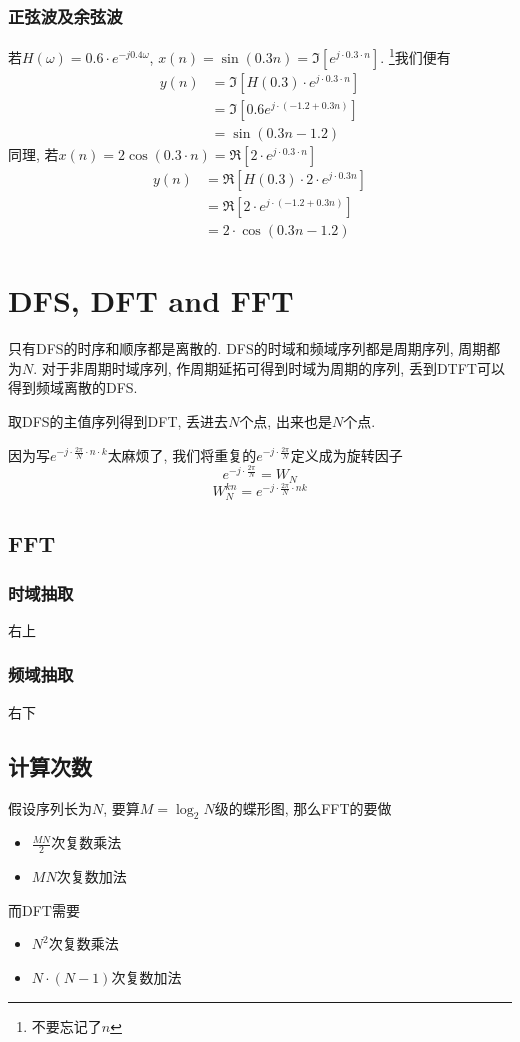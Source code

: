 \documentclass[a4paper]{report}
\begin{document}
\subsection{正弦波及余弦波}
若$H(\omega)=0.6\cdot e^{-j0.4\omega}$, $x(n)=\sin(0.3n)=\Im[e^{j\cdot 0.3\cdot n}]$. \footnote{不要忘记了$n$}我们便有
\begin{align*}
  y(n)&=\Im[H(0.3)\cdot e^{j\cdot 0.3\cdot n}]
  \\ &=\Im[0.6e^{j\cdot (-1.2+0.3n)}]
  \\ &=\sin (0.3n-1.2)
\end{align*}
同理, 若$x(n)=2 \cos(0.3\cdot n)=\Re[2\cdot e^{j\cdot 0.3\cdot n}]$
\begin{align*}
  y(n)&=\Re[H(0.3)\cdot 2\cdot e^{j\cdot 0.3n}]
  \\ &=\Re[2\cdot e^{j\cdot (-1.2+0.3n)}]
  \\ &= 2\cdot \cos (0.3n-1.2)
\end{align*}

\chapter{DFS, DFT and FFT}
只有DFS的时序和顺序都是离散的. DFS的时域和频域序列都是周期序列, 周期都为$N$. 对于非周期时域序列, 作周期延拓可得到时域为周期的序列, 丢到DTFT可以得到频域离散的DFS. 


取DFS的主值序列得到DFT, 丢进去$N$个点, 出来也是$N$个点. 

因为写$e^{-j\cdot \frac{2\pi}{N}\cdot n\cdot k}$太麻烦了, 我们将重复的$e^{-j\cdot\frac{2\pi}{N}}$定义成为旋转因子
\begin{equation}
  e^{-j\cdot\frac{2\pi}{N}}=W_N
\end{equation}
\begin{equation}
  W_N^{kn}=e^{-j\cdot \frac{2\pi}{N}\cdot n k}
\end{equation}
\section{FFT}
\subsection{时域抽取}
右上
\subsection{频域抽取}
右下
\section{计算次数}
假设序列长为$N$, 要算$M=\log_2{N}$级的蝶形图, 那么FFT的要做
\begin{itemize}
  \item $\frac{MN}{2}$次复数乘法
  \item $MN$次复数加法
\end{itemize}
而DFT需要
\begin{itemize}
  \item $N^2$次复数乘法
  \item $N\cdot (N-1)$次复数加法
\end{itemize}
\end{document}
